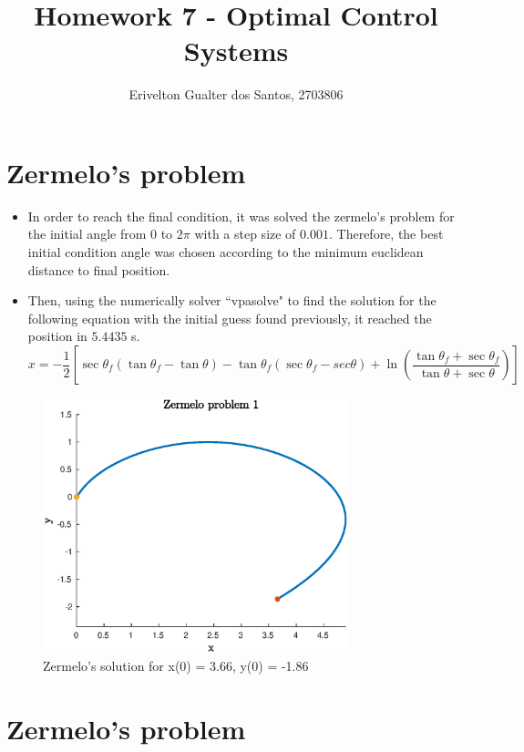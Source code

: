\documentclass{article}
\begin{document}
\title{Homework 7 - Optimal Control Systems}
\author{Erivelton Gualter dos Santos, 2703806}
\date{}

\maketitle 

\section{Zermelo's problem}

\begin{itemize}
\item In order to reach the final condition, it was solved the zermelo's problem for the initial angle from $0$ to $2\pi$ with a step size of $0.001$. Therefore, the best initial condition angle was chosen according to the minimum euclidean distance to final position.
\item Then,  using the numerically solver ``vpasolve" to find the solution for the following equation with the initial guess found previously, it reached the position in $5.4435$ s.
\begin{equation*}
x = -\frac{1}{2}\left[\sec\theta_f(\tan\theta_f - \tan\theta) - \tan\theta_f(\sec\theta_f-sec\theta)+\ln\left(\frac{\tan\theta_f+\sec\theta_f}{\tan\theta+\sec\theta} \right) \right]
\end{equation*}
\end{itemize}

\begin{figure}[H]
\centering
\includegraphics [width=3.5in]{f1}
\caption{Zermelo's solution for x(0) = 3.66, y(0) = -1.86 }
\end{figure}

\section{Zermelo's problem}
\end{document}

